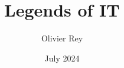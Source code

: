 \documentclass[]{article}
\title{Legends of IT}
\author{Olivier Rey}
\date{July 2024}
\begin{document}
\maketitle

\begin{abstract}

\end{abstract}

\section{}
\end{document}
